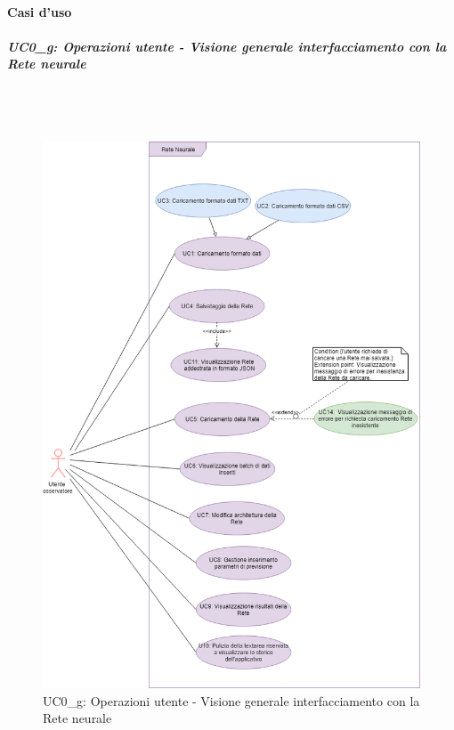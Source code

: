 \paragraph{Casi d'uso}\mbox{}
\label{Casi d'uso}
\noindent
\subparagraph{UC0\_g: Operazioni utente - Visione generale interfacciamento con la Rete neurale}\mbox{}\\\\
\label{UC0_g: Operazioni utente - Visione generale interfacciamento con la Rete neurale}
\noindent
\begin{figure}[H]
\centering
	\includegraphics[width=1\linewidth]{./image/uc0_g.png}
	\caption{UC0\_g: Operazioni utente - Visione generale interfacciamento con la Rete neurale}
	\label{UC0_g: Operazioni utente - Visione generale interfacciamento con la Rete neurale}
\end{figure}
\noindent
